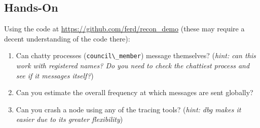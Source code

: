 \documentclass[11pt, oneside]{book}   	%
\newcommand{\module}[1]{\Verb`#1`}
\begin{document}
\subsection{Hands-On}

Using the code at \href{https://github.com/ferd/recon\_demo}{https://github.com/ferd/recon\_demo} (these may require a decent understanding of the code there):

\begin{enumerate}
	\item Can chatty processes (\module{council\_member}) message themselves? (\emph{hint: can this work with registered names? Do you need to check the chattiest process and see if it messages itself?})
	\item Can you estimate the overall frequency at which messages are sent globally?
	\item Can you crash a node using any of the tracing tools? (\emph{hint: dbg makes it easier due to its greater flexibility})
\end{enumerate}



\end{document}
